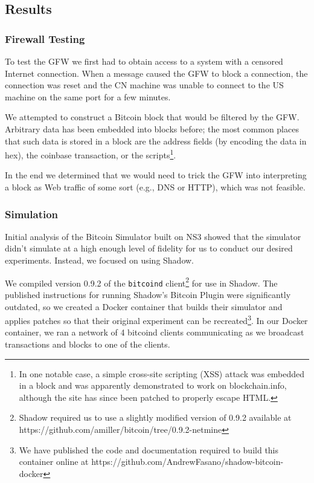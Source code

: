 \subsection{Results}
\subsubsection{Firewall Testing}
To test the GFW we first had to obtain access to a system with a censored Internet connection. When a message caused the GFW to block a connection, the connection was reset and the CN machine was unable to connect to the US machine on the same port for a few minutes.

We attempted to construct a Bitcoin block that would be filtered by the GFW. Arbitrary data has been embedded into blocks before; the most common places that such data is stored in a block are the address fields (by encoding the data in hex), the coinbase transaction, or the scripts\footnote{In one notable case, a simple cross-site scripting (XSS) attack was embedded in a block and was apparently demonstrated to work on blockchain.info\cite{reddit}, although the site has since been patched to properly escape HTML.}. 

In the end we determined that we would need to trick the GFW into interpreting a block as Web traffic of some sort (e.g., DNS or HTTP), which was not feasible.

\subsubsection{Simulation}
Initial analysis of the Bitcoin Simulator built on NS3 showed that the simulator didn't simulate at a high enough level of fidelity for us to conduct our desired experiments. Instead, we focused on using Shadow.

We compiled version 0.9.2 of the \texttt{bitcoind} client\footnote{Shadow required us to use a slightly modified version of 0.9.2 available at https://github.com/amiller/bitcoin/tree/0.9.2-netmine} for use in Shadow. The published instructions for running Shadow's Bitcoin Plugin were significantly outdated, so we created a Docker container that builds their simulator and applies patches so that their original experiment can be recreated\footnote{We have published the code and documentation required to build this container online at https://github.com/AndrewFasano/shadow-bitcoin-docker}. In our Docker container, we ran a network of 4 bitcoind clients communicating as we broadcast transactions and blocks to one of the clients.

